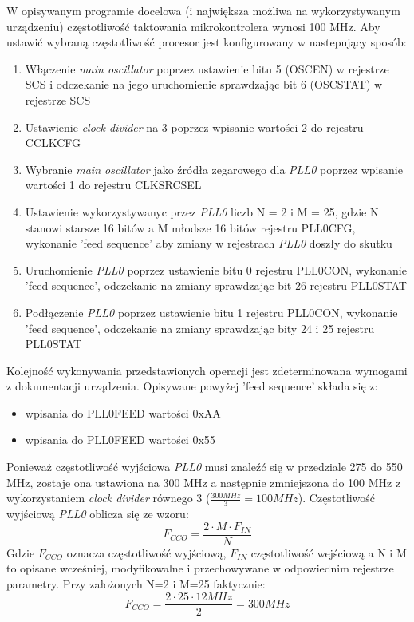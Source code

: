 W opisywanym programie docelowa (i największa możliwa na wykorzystywanym urządzeniu) częstotliwość taktowania mikrokontrolera wynosi 100 MHz. Aby ustawić wybraną częstotliwość procesor jest konfigurowany w nastepujący sposób:
\begin{enumerate}
    \item Włączenie \emph{main oscillator} poprzez ustawienie bitu 5 (OSCEN) w rejestrze SCS i odczekanie na jego uruchomienie sprawdzając bit 6 (OSCSTAT) w rejestrze SCS
    \item Ustawienie \emph{clock divider} na 3 poprzez wpisanie wartości 2 do rejestru CCLKCFG
    \item Wybranie \emph{main oscillator} jako źródła zegarowego dla \emph{PLL0} poprzez wpisanie wartości 1 do rejestru CLKSRCSEL
    \item Ustawienie wykorzystywanyc przez \emph{PLL0} liczb N = 2 i M = 25, gdzie N stanowi starsze 16 bitów a M młodsze 16 bitów rejestru PLL0CFG, wykonanie 'feed sequence' aby zmiany w rejestrach \emph{PLL0} doszły do skutku
    \item Uruchomienie \emph{PLL0} poprzez ustawienie bitu 0 rejestru PLL0CON, wykonanie 'feed sequence', odczekanie na zmiany sprawdzając bit 26 rejestru PLL0STAT
    \item Podłączenie \emph{PLL0} poprzez ustawienie bitu 1 rejestru PLL0CON, wykonanie 'feed sequence', odczekanie na zmiany sprawdzając bity 24 i 25 rejestru PLL0STAT
\end{enumerate}
Kolejność wykonywania przedstawionych operacji jest zdeterminowana wymogami z dokumentacji urządzenia. Opisywane powyżej 'feed sequence' składa się z:
\begin{itemize}
    \item wpisania do PLL0FEED wartości 0xAA
    \item wpisania do PLL0FEED wartości 0x55
\end{itemize}
Ponieważ częstotliwość wyjściowa \emph{PLL0} musi znaleźć się w przedziale 275 do 550 MHz, zostaje ona ustawiona na 300 MHz a następnie zmniejszona do 100 MHz z wykorzystaniem \emph{clock divider} równego 3 ($\frac{300MHz}{3}=100MHz$). Częstotliwość wyjściową \emph{PLL0} oblicza się ze wzoru:
\begin{equation}
    F_{CCO}=\frac{2 \cdot M \cdot F_{IN}}{N}
\end{equation}
Gdzie $F_{CCO}$ oznacza częstotliwość wyjściową, $F_{IN}$ częstotliwość wejściową a N i M to opisane wcześniej, modyfikowalne i przechowywane w odpowiednim rejestrze parametry. Przy założonych N=2 i M=25 faktycznie:
\begin{displaymath}
    F_{CCO}=\frac{2 \cdot 25 \cdot 12MHz}{2}=300MHz
\end{displaymath}
